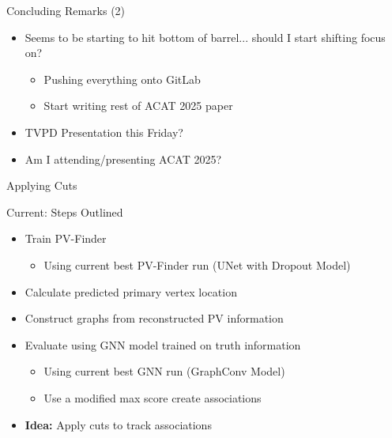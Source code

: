 \documentclass[xcolor=table,aspectratio=169]{beamer}
\begin{document}
\begin{frame}{Concluding Remarks (2)}
    \begin{itemize}
        \item Seems to be starting to hit bottom of barrel... should I start shifting focus on?
        \begin{itemize}
            \item Pushing everything onto GitLab
            \item Start writing rest of ACAT 2025 paper
        \end{itemize}
        \item TVPD Presentation this Friday?
        \item Am I attending/presenting ACAT 2025?
    \end{itemize}
\end{frame}

\begin{frame}[plain]
    \centering
    Applying Cuts
\end{frame}

\begin{frame}{Current: Steps Outlined}
    \begin{itemize}
        \item Train PV-Finder
        \begin{itemize}
            \item Using current best PV-Finder run (UNet with Dropout Model)
        \end{itemize}
        \item Calculate predicted primary vertex location
        \item Construct graphs from reconstructed PV information
        \item Evaluate using GNN model trained on truth information
        \begin{itemize}
            \item Using current best GNN run (GraphConv Model)
            \item Use a modified max score create associations
        \end{itemize}
        \item \textbf{Idea:} Apply cuts to track associations
    \end{itemize}
\end{frame}
\end{document}

